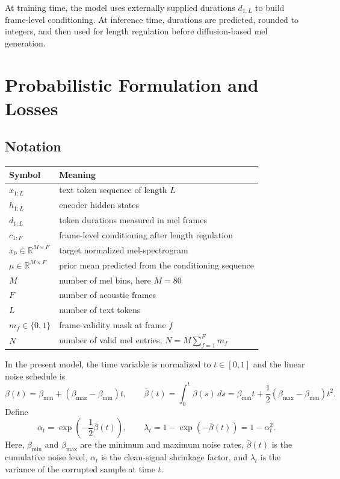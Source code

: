 \documentclass[11pt,a4paper]{article}
\newcommand{\R}{\mathbb{R}}
\begin{document}
At training time, the model uses externally supplied durations $d_{1:L}$ to build frame-level conditioning. At inference time, durations are predicted, rounded to integers, and then used for length regulation before diffusion-based mel generation.

\section{Probabilistic Formulation and Losses}

\subsection{Notation}

\begin{tabularx}{\linewidth}{@{}lY@{}}
\toprule
Symbol & Meaning \\
\midrule
$x_{1:L}$ & text token sequence of length $L$ \\
$h_{1:L}$ & encoder hidden states \\
$d_{1:L}$ & token durations measured in mel frames \\
$c_{1:F}$ & frame-level conditioning after length regulation \\
$x_0 \in \R^{M\times F}$ & target normalized mel-spectrogram \\
$\mu \in \R^{M\times F}$ & prior mean predicted from the conditioning sequence \\
$M$ & number of mel bins, here $M=80$ \\
$F$ & number of acoustic frames \\
$L$ & number of text tokens \\
$m_f \in \{0,1\}$ & frame-validity mask at frame $f$ \\
$N$ & number of valid mel entries, $N=M\sum_{f=1}^{F} m_f$ \\
\bottomrule
\end{tabularx}

In the present model, the time variable is normalized to $t\in[0,1]$ and the linear noise schedule is
\[
\beta(t) = \beta_{\min} + (\beta_{\max} - \beta_{\min})t,
\qquad
\bar{\beta}(t) = \int_0^t \beta(s)\,ds
= \beta_{\min} t + \frac{1}{2}(\beta_{\max}-\beta_{\min})t^2.
\]
Define
\[
\alpha_t = \exp\!\left(-\frac{1}{2}\bar{\beta}(t)\right),
\qquad
\lambda_t = 1 - \exp(-\bar{\beta}(t)) = 1-\alpha_t^2.
\]
Here, $\beta_{\min}$ and $\beta_{\max}$ are the minimum and maximum noise rates, $\bar{\beta}(t)$ is the cumulative noise level, $\alpha_t$ is the clean-signal shrinkage factor, and $\lambda_t$ is the variance of the corrupted sample at time $t$.
\end{document}
